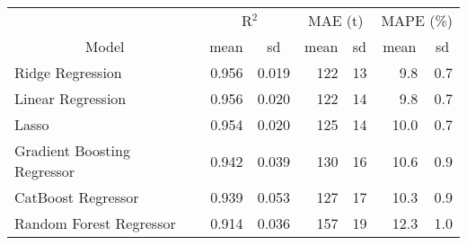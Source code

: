 
\begin{tabular}[t]{lrrrrrr}
\toprule
\multicolumn{1}{c}{ } & \multicolumn{2}{c}{R$^2$} & \multicolumn{2}{c}{MAE (t)} & \multicolumn{2}{c}{MAPE (\%)} \\
\cmidrule(l{3pt}r{3pt}){2-3} \cmidrule(l{3pt}r{3pt}){4-5} \cmidrule(l{3pt}r{3pt}){6-7}
\multicolumn{1}{c}{Model} & \multicolumn{1}{c}{mean} & \multicolumn{1}{c}{sd} & \multicolumn{1}{c}{mean} & \multicolumn{1}{c}{sd} & \multicolumn{1}{c}{mean} & \multicolumn{1}{c}{sd}\\
\midrule
Ridge Regression & 0.956 & 0.019 & 122 & 13 & 9.8 & 0.7\\
Linear Regression & 0.956 & 0.020 & 122 & 14 & 9.8 & 0.7\\
Lasso & 0.954 & 0.020 & 125 & 14 & 10.0 & 0.7\\
Gradient Boosting Regressor & 0.942 & 0.039 & 130 & 16 & 10.6 & 0.9\\
CatBoost Regressor & 0.939 & 0.053 & 127 & 17 & 10.3 & 0.9\\
Random Forest Regressor & 0.914 & 0.036 & 157 & 19 & 12.3 & 1.0\\
\bottomrule
\end{tabular}
